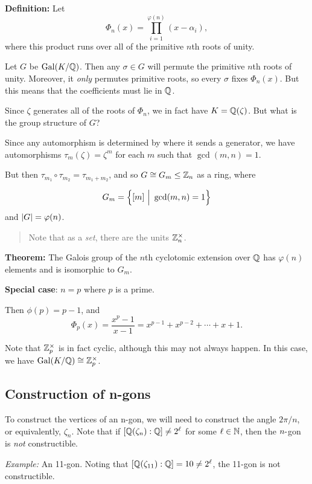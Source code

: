\textbf{Definition:} Let \[
\Phi_n(x) = \prod_{i=1}^{\varphi(n)} (x-\alpha_i)
,\] where this product runs over all of the primitive \(n\)th roots of
unity.

Let \(G\) be \(\mathrm{Gal}(K/{\mathbb{Q}})\). Then any \(\sigma\in G\) will permute the
primitive \(n\)th roots of unity. Moreover, it \emph{only} permutes
primitive roots, so every \(\sigma\) fixes \(\Phi_n(x)\). But this means
that the coefficients must lie in \({\mathbb{Q}}\).

Since \(\zeta\) generates all of the roots of \(\Phi_n\), we in fact
have \(K = {\mathbb{Q}}(\zeta)\). But what is the group structure of \(G\)?

Since any automorphism is determined by where it sends a generator, we
have automorphisms \(\tau_m(\zeta) = \zeta^m\) for each \(m\) such that
\(\gcd(m, n) = 1\).

But then \(\tau_{m_1} \circ \tau_{m_2} = \tau_{m_1 + m_2}\), and so
\(G \cong G_m \leq {\mathbb{Z}}_n\) as a ring, where

\[
G_m = \left\{{[m] {~\mathrel{\Big|}~} \gcd(m, n) = 1}\right\}
\] and \({\left\lvert {G} \right\rvert} = \varphi(n)\).

\begin{quote}
Note that as a \emph{set}, there are the units \({\mathbb{Z}}_n^{\times}\).
\end{quote}

\textbf{Theorem:} The Galois group of the \(n\)th cyclotomic extension
over \({\mathbb{Q}}\) has \(\varphi(n)\) elements and is isomorphic to \(G_m\).

\textbf{Special case}: \(n=p\) where \(p\) is a prime.

Then \(\phi(p) = p-1\), and \[
\Phi_p(x) = \frac{x^p - 1}{x-1} = x^{p-1} + x^{p-2} + \cdots + x + 1
.\]

Note that \({\mathbb{Z}}_p^{\times}\) is in fact cyclic, although this may not
always happen. In this case, we have \(\mathrm{Gal}(K/{\mathbb{Q}}) \cong {\mathbb{Z}}_p^{\times}\).

\hypertarget{construction-of-n-gons}{%
\subsection{Construction of n-gons}\label{construction-of-n-gons}}

To construct the vertices of an n-gon, we will need to construct the
angle \(2\pi/n\), or equivalently, \(\zeta_n\). Note that if
\([{\mathbb{Q}}(\zeta_n) : {\mathbb{Q}}] \neq 2^\ell\) for some \(\ell\in{\mathbb{N}}\), then the
\(n{\hbox{-}}\)gon is \emph{not} constructible.

\emph{Example:} An 11-gon. Noting that
\([{\mathbb{Q}}(\zeta_{11}) : {\mathbb{Q}}] = 10 \neq 2^\ell\), the 11-gon is not
constructible.

